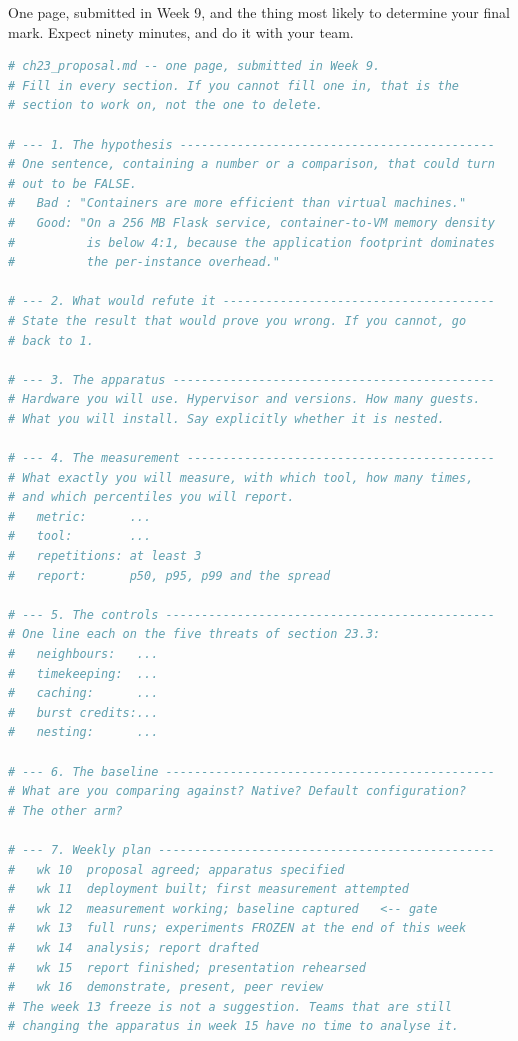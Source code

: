 \begin{lab}
One page, submitted in Week 9, and the thing most likely to determine your
final mark. Expect ninety minutes, and do it with your team.

\begin{lstlisting}[language=bash]
# ch23_proposal.md -- one page, submitted in Week 9.
# Fill in every section. If you cannot fill one in, that is the
# section to work on, not the one to delete.

# --- 1. The hypothesis --------------------------------------------
# One sentence, containing a number or a comparison, that could turn
# out to be FALSE.
#   Bad : "Containers are more efficient than virtual machines."
#   Good: "On a 256 MB Flask service, container-to-VM memory density
#          is below 4:1, because the application footprint dominates
#          the per-instance overhead."

# --- 2. What would refute it --------------------------------------
# State the result that would prove you wrong. If you cannot, go
# back to 1.

# --- 3. The apparatus ---------------------------------------------
# Hardware you will use. Hypervisor and versions. How many guests.
# What you will install. Say explicitly whether it is nested.

# --- 4. The measurement -------------------------------------------
# What exactly you will measure, with which tool, how many times,
# and which percentiles you will report.
#   metric:      ...
#   tool:        ...
#   repetitions: at least 3
#   report:      p50, p95, p99 and the spread

# --- 5. The controls ----------------------------------------------
# One line each on the five threats of section 23.3:
#   neighbours:   ...
#   timekeeping:  ...
#   caching:      ...
#   burst credits:...
#   nesting:      ...

# --- 6. The baseline ----------------------------------------------
# What are you comparing against? Native? Default configuration?
# The other arm?

# --- 7. Weekly plan -----------------------------------------------
#   wk 10  proposal agreed; apparatus specified
#   wk 11  deployment built; first measurement attempted
#   wk 12  measurement working; baseline captured   <-- gate
#   wk 13  full runs; experiments FROZEN at the end of this week
#   wk 14  analysis; report drafted
#   wk 15  report finished; presentation rehearsed
#   wk 16  demonstrate, present, peer review
# The week 13 freeze is not a suggestion. Teams that are still
# changing the apparatus in week 15 have no time to analyse it.


\end{lstlisting}
\end{lab}
